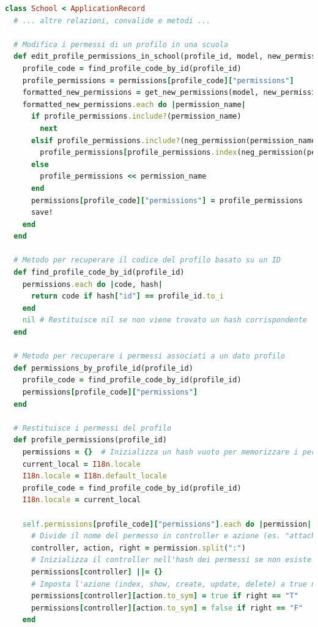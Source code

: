 \documentclass[a4paper, 12pt]{book}
\begin{document}
\begin{lstlisting}[language=Ruby, caption={Modello School: gestione dei permessi}]
class School < ApplicationRecord
  # ... altre relazioni, convalide e metodi ...

  # Modifica i permessi di un profilo in una scuola
  def edit_profile_permissions_in_school(profile_id, model, new_permissions)
    profile_code = find_profile_code_by_id(profile_id)
    profile_permissions = permissions[profile_code]["permissions"]
    formatted_new_permissions = get_new_permissions(model, new_permissions)
    formatted_new_permissions.each do |permission_name|
      if profile_permissions.include?(permission_name)
        next
      elsif profile_permissions.include?(neg_permission(permission_name))
        profile_permissions[profile_permissions.index(neg_permission(permission_name))] = permission_name
      else
        profile_permissions << permission_name
      end
      permissions[profile_code]["permissions"] = profile_permissions
      save!
    end
  end

  # Metodo per recuperare il codice del profilo basato su un ID
  def find_profile_code_by_id(profile_id)
    permissions.each do |code, hash|
      return code if hash["id"] == profile_id.to_i
    end
    nil # Restituisce nil se non viene trovato un hash corrispondente
  end

  # Metodo per recuperare i permessi associati a un dato profilo
  def permissions_by_profile_id(profile_id)
    profile_code = find_profile_code_by_id(profile_id)
    permissions[profile_code]["permissions"]
  end

  # Restituisce i permessi del profilo
  def profile_permissions(profile_id)
    permissions = {}  # Inizializza un hash vuoto per memorizzare i permessi
    current_local = I18n.locale
    I18n.locale = I18n.default_locale
    profile_code = find_profile_code_by_id(profile_id)
    I18n.locale = current_local

    self.permissions[profile_code]["permissions"].each do |permission|
      # Divide il nome del permesso in controller e azione (es. "attachment:index" => ["attachment", "index"])
      controller, action, right = permission.split(":")
      # Inizializza il controller nell'hash dei permessi se non esiste
      permissions[controller] ||= {}
      # Imposta l'azione (index, show, create, update, delete) a true nell'hash dei permessi
      permissions[controller][action.to_sym] = true if right == "T"
      permissions[controller][action.to_sym] = false if right == "F"
    end


\end{lstlisting}
\end{document}
